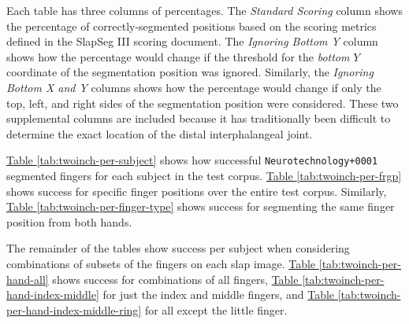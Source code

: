\documentclass[]{article}
\begin{document}
Each table has three columns of percentages. The \emph{Standard Scoring}
column shows the percentage of correctly-segmented positions based on
the scoring metrics defined in the SlapSeg III scoring document. The
\emph{Ignoring Bottom Y} column shows how the percentage would change if
the threshold for the \emph{bottom} \(Y\) coordinate of the segmentation
position was ignored. Similarly, the \emph{Ignoring Bottom X and Y}
columns shows how the percentage would change if only the top, left, and
right sides of the segmentation position were considered. These two
supplemental columns are included because it has traditionally been
difficult to determine the exact location of the distal interphalangeal
joint.

\protect\hyperlink{twoinch-per-subject}{Table
\ref{tab:twoinch-per-subject}} shows how successful
\texttt{Neurotechnology+0001} segmented fingers for each subject in the
test corpus. \protect\hyperlink{twoinch-per-frgp}{Table
\ref{tab:twoinch-per-frgp}} shows success for specific finger positions
over the entire test corpus. Similarly,
\protect\hyperlink{twoinch-per-finger-type}{Table
\ref{tab:twoinch-per-finger-type}} shows success for segmenting the same
finger position from both hands.

The remainder of the tables show success per subject when considering
combinations of subsets of the fingers on each slap image.
\protect\hyperlink{twoinch-per-hand-all}{Table
\ref{tab:twoinch-per-hand-all}} shows success for combinations of all
fingers, \protect\hyperlink{twoinch-per-hand-index-middle}{Table
\ref{tab:twoinch-per-hand-index-middle}} for just the index and middle
fingers, and
\protect\hyperlink{twoinch-per-hand-index-middle-ux5cux2520ring}{Table
\ref{tab:twoinch-per-hand-index-middle-ring}} for all except the little
finger.
\end{document}
